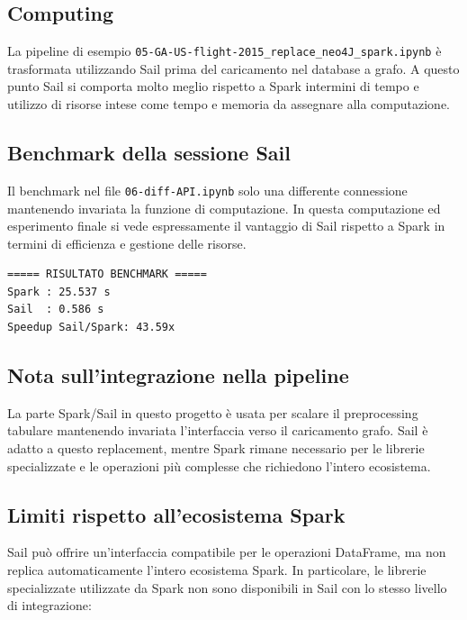 \documentclass{article}
\begin{document}
\subsection{Computing}
La pipeline di esempio \texttt{05-GA-US-flight-2015\_replace\_neo4J\_spark.ipynb} è %
trasformata utilizzando Sail prima del caricamento nel database a grafo. %
A questo punto Sail si comporta molto meglio rispetto a Spark intermini %
di tempo e utilizzo di risorse intese come tempo e %
memoria da assegnare alla computazione.


\subsection{Benchmark della sessione Sail}
Il benchmark nel file \texttt{06-diff-API.ipynb} solo una differente connessione %
mantenendo invariata la funzione di computazione. %
In questa computazione ed esperimento finale si vede espressamente il vantaggio di Sail %
rispetto a Spark in termini di efficienza e gestione delle risorse. %

\begin{lstlisting}
===== RISULTATO BENCHMARK =====
Spark : 25.537 s
Sail  : 0.586 s
Speedup Sail/Spark: 43.59x
\end{lstlisting}



\subsection{Nota sull'integrazione nella pipeline}
La parte Spark/Sail in questo progetto è usata per scalare il preprocessing %
tabulare mantenendo invariata l'interfaccia verso il caricamento grafo. %
Sail è adatto a questo replacement, mentre Spark rimane necessario per le %
librerie specializzate e le operazioni più complesse che richiedono l'intero ecosistema.


\subsection{Limiti rispetto all'ecosistema Spark}
Sail può offrire un'interfaccia compatibile per le operazioni DataFrame, %
ma non replica automaticamente l'intero ecosistema Spark. %
In particolare, le librerie specializzate utilizzate da Spark non sono %
disponibili in Sail con lo stesso livello di integrazione:
\end{document}
